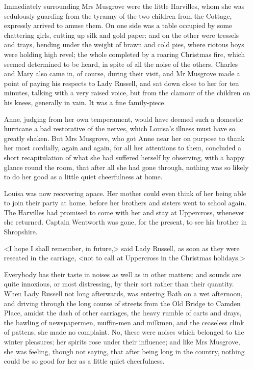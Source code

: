 Immediately surrounding Mrs Musgrove were the little Harvilles, whom she was sedulously guarding from the tyranny of the two children from the Cottage, expressly arrived to amuse them. On one side was a table occupied by some chattering girls, cutting up silk and gold paper; and on the other were tressels and trays, bending under the weight of brawn and cold pies, where riotous boys were holding high revel; the whole completed by a roaring Christmas fire, which seemed determined to be heard, in spite of all the noise of the others. Charles and Mary also came in, of course, during their visit, and Mr Musgrove made a point of paying his respects to Lady Russell, and sat down close to her for ten minutes, talking with a very raised voice, but from the clamour of the children on his knees, generally in vain. It was a fine family-piece.

Anne, judging from her own temperament, would have deemed such a domestic hurricane a bad restorative of the nerves, which Louisa's illness must have so greatly shaken. But Mrs Musgrove, who got Anne near her on purpose to thank her most cordially, again and again, for all her attentions to them, concluded a short recapitulation of what she had suffered herself by observing, with a happy glance round the room, that after all she had gone through, nothing was so likely to do her good as a little quiet cheerfulness at home.

Louisa was now recovering apace. Her mother could even think of her being able to join their party at home, before her brothers and sisters went to school again. The Harvilles had promised to come with her and stay at Uppercross, whenever she returned. Captain Wentworth was gone, for the present, to see his brother in Shropshire.

<I hope I shall remember, in future,> said Lady Russell, as soon as they were reseated in the carriage, <not to call at Uppercross in the Christmas holidays.>

Everybody has their taste in noises as well as in other matters; and sounds are quite innoxious, or most distressing, by their sort rather than their quantity. When Lady Russell not long afterwards, was entering Bath on a wet afternoon, and driving through the long course of streets from the Old Bridge to Camden Place, amidst the dash of other carriages, the heavy rumble of carts and drays, the bawling of newspapermen, muffin-men and milkmen, and the ceaseless clink of pattens, she made no complaint. No, these were noises which belonged to the winter pleasures; her spirits rose under their influence; and like Mrs Musgrove, she was feeling, though not saying, that after being long in the country, nothing could be so good for her as a little quiet cheerfulness.

